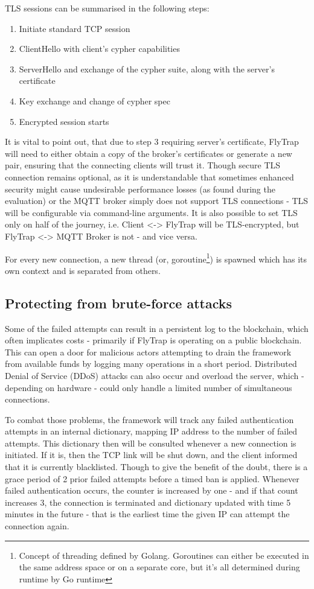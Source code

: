 TLS sessions can be summarised in the following steps:
\begin{enumerate}
\item Initiate standard TCP session
\item ClientHello with client's cypher capabilities 
\item ServerHello and exchange of the cypher suite, along with the server's certificate
\item Key exchange and change of cypher spec
\item Encrypted session starts
\end{enumerate}

It is vital to point out, that due to step 3 requiring server's certificate, FlyTrap will need to either obtain a copy of the broker's certificates or generate a new pair, ensuring that the connecting clients will trust it. Though secure TLS connection remains optional, as it is understandable that sometimes enhanced security might cause undesirable performance losses (as found during the evaluation) or the MQTT broker simply does not support TLS connections - TLS will be configurable via command-line arguments. It is also possible to set TLS only on half of the journey, i.e. Client <-> FlyTrap will be TLS-encrypted, but FlyTrap <-> MQTT Broker is not - and vice versa.

For every new connection, a new thread (or, goroutine\footnote{Concept of threading defined by Golang. Goroutines can either be executed in the same address space or on a separate core, but it's all determined during runtime by Go runtime}) is spawned which has its own context and is separated from others.

\subsection{Protecting from brute-force attacks}
Some of the failed attempts can result in a persistent log to the blockchain, which often implicates costs - primarily if FlyTrap is operating on a public blockchain. This can open a door for malicious actors attempting to drain the framework from available funds by logging many operations in a short period. Distributed Denial of Service (DDoS) attacks can also occur and overload the server, which - depending on hardware - could only handle a limited number of simultaneous connections.

To combat those problems, the framework will track any failed authentication attempts in an internal dictionary, mapping IP address to the number of failed attempts. This dictionary then will be consulted whenever a new connection is initiated. If it is, then the TCP link will be shut down, and the client informed that it is currently blacklisted. Though to give the benefit of the doubt, there is a grace period of 2 prior failed attempts before a timed ban is applied. Whenever failed authentication occurs, the counter is increased by one - and if that count increases 3, the connection is terminated and dictionary updated with time 5 minutes in the future - that is the earliest time the given IP can attempt the connection again.
